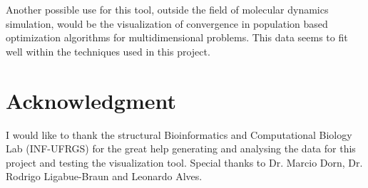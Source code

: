 \documentclass[10pt, conference]{IEEEtran}
\begin{document}
Another possible use for this tool, outside the field of molecular dynamics simulation, would be the visualization of convergence in population based optimization algorithms for multidimensional problems. This data seems to fit well within the techniques used in this project.

\iffinal
\section*{Acknowledgment}
%
I would like to thank the structural Bioinformatics and Computational Biology Lab (INF-UFRGS) for the great help generating and analysing the data for this project and testing the visualization tool. Special thanks to Dr. Marcio Dorn, Dr. Rodrigo Ligabue-Braun and Leonardo Alves. 

\fi







\end{document}
